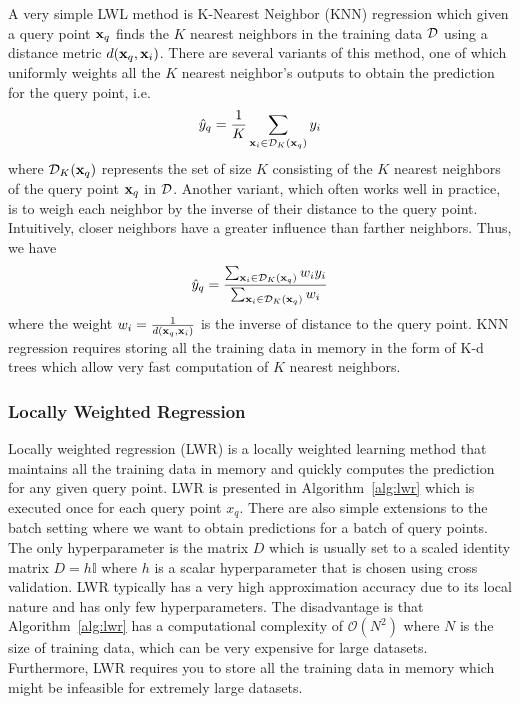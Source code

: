 A very simple LWL method is K-Nearest Neighbor (KNN) regression which
given a query point $\mathbf{x}_q$ finds the $K$ nearest neighbors in the
training data $\mathcal{D}$ using a distance metric $d(\mathbf{x}_q,
\mathbf{x}_i)$. There are several variants of this method, one of which
uniformly weights all the $K$ nearest neighbor's outputs to obtain the
prediction for the query point, i.e.
\begin{equation}
  \label{eq:14}
  \hat{y}_q = \frac{1}{K} \sum_{\mathbf{x}_i \in \mathcal{D}_K(\mathbf{x}_q)} y_i
\end{equation}
where $\mathcal{D}_K(\mathbf{x}_q)$ represents the set of size $K$ consisting
of the $K$ nearest neighbors of the query point $\mathbf{x}_q$ in
$\mathcal{D}$. Another variant, which often works well in practice, is to
weigh each neighbor by the inverse of their distance to the query
point. Intuitively, closer neighbors have a greater influence than
farther neighbors. Thus, we have
\begin{equation}
  \label{eq:15}
  \hat{y}_q = \frac{\sum_{\mathbf{x}_i \in \mathcal{D}_K(\mathbf{x}_q)} w_iy_i}{\sum_{\mathbf{x}_i \in \mathcal{D}_K(\mathbf{x}_q)} w_i}
\end{equation}
where the weight $w_i = \frac{1}{d(\mathbf{x}_q, \mathbf{x}_i)}$ is the
inverse of distance to the query point. KNN regression requires
storing all the training data in memory in the form of K-d trees which
allow very fast computation of $K$ nearest neighbors.

\subsubsection{Locally Weighted Regression}
\label{sec:locally-weight-regr}

Locally weighted regression (LWR) is a locally weighted learning
method that maintains all the training data in memory and quickly
computes the prediction for any given query point. LWR is presented in
Algorithm~\ref{alg:lwr} which is executed once for each query point
$x_q$. There are also simple extensions to the batch setting where we
want to obtain predictions for a batch of query points. The only
hyperparameter is the matrix $D$ which is usually set to a scaled
identity matrix $D = h\mathbb{I}$ where $h$ is a scalar hyperparameter
that is chosen using cross validation. LWR typically has a very high
approximation accuracy due to its local nature and has only few
hyperparameters. The disadvantage is that Algorithm~\ref{alg:lwr} has
a computational complexity of $\mathcal{O}(N^2)$ where $N$ is the size
of training data, which can be very expensive for large
datasets. Furthermore, LWR requires you to store all the training data
in memory which might be infeasible for extremely large datasets.

